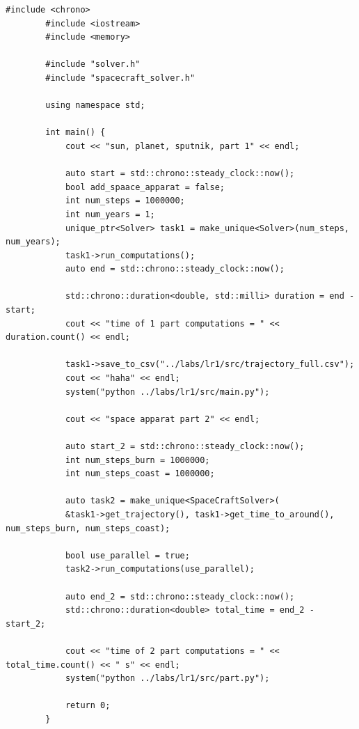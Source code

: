\documentclass[14pt,a4paper]{extarticle}
\theoremstyle{plain}
\begin{document}
	\begin{lstlisting}[title=main.cpp, gobble=16, breaklines=true, breakatwhitespace=true]
		#include <chrono>
		#include <iostream>
		#include <memory>
		
		#include "solver.h"
		#include "spacecraft_solver.h"
		
		using namespace std;
		
		int main() {
			cout << "sun, planet, sputnik, part 1" << endl;
			
			auto start = std::chrono::steady_clock::now();
			bool add_spaace_apparat = false;
			int num_steps = 1000000;
			int num_years = 1;
			unique_ptr<Solver> task1 = make_unique<Solver>(num_steps, num_years);
			task1->run_computations();
			auto end = std::chrono::steady_clock::now();
			
			std::chrono::duration<double, std::milli> duration = end - start;
			cout << "time of 1 part computations = " << duration.count() << endl;
			
			task1->save_to_csv("../labs/lr1/src/trajectory_full.csv");
			cout << "haha" << endl;
			system("python ../labs/lr1/src/main.py");
			
			cout << "space apparat part 2" << endl;
			
			auto start_2 = std::chrono::steady_clock::now();
			int num_steps_burn = 1000000;
			int num_steps_coast = 1000000;
			
			auto task2 = make_unique<SpaceCraftSolver>(
			&task1->get_trajectory(), task1->get_time_to_around(), num_steps_burn, num_steps_coast);
			
			bool use_parallel = true;
			task2->run_computations(use_parallel);
			
			auto end_2 = std::chrono::steady_clock::now();
			std::chrono::duration<double> total_time = end_2 - start_2;
			
			cout << "time of 2 part computations = " << total_time.count() << " s" << endl;
			system("python ../labs/lr1/src/part.py");
			
			return 0;
		}
	\end{lstlisting}
	
\end{document}
